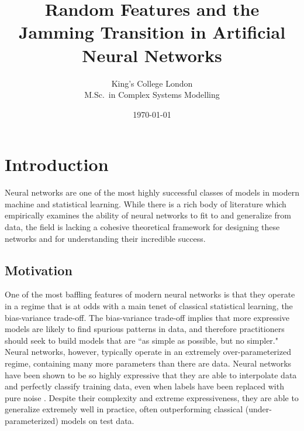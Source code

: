 \documentclass[a4paper, 12pt, titlepage]{article}
\begin{document}
\title{\bf Random Features and the Jamming Transition in Artificial Neural Networks}
\author{
    King's College London\\
    M.Sc.\ in Complex Systems Modelling
}
\date{\today}
\maketitle

\begin{abstract}
\lipsum[1]
\end{abstract}

\section{Introduction}
Neural networks are one of the most highly successful classes of models in modern machine and statistical learning. While there is a rich body of literature which empirically examines the ability of neural networks to fit to and generalize from data, the field is lacking a cohesive theoretical framework for designing these networks and for understanding their incredible success. \\

\subsection{Motivation}

One of the most baffling features of modern neural networks is that they operate in a regime that is at odds with a main tenet of classical statistical learning, the bias-variance trade-off. The bias-variance trade-off implies that more expressive models are likely to find spurious patterns in data, and therefore practitioners should seek to build models that are ``as simple as possible, but no simpler." Neural networks, however, typically operate in an extremely over-parameterized regime, containing many more parameters than there are data. Neural networks have been shown to be so highly expressive that they are able to interpolate data and perfectly classify training data, even when labels have been replaced with pure noise \cite{zhangUnderstandingDeepLearning2017}. Despite their complexity and extreme expressiveness, they are able to generalize extremely well in practice, often outperforming classical (under-parameterized) models on test data. \\
\end{document}
